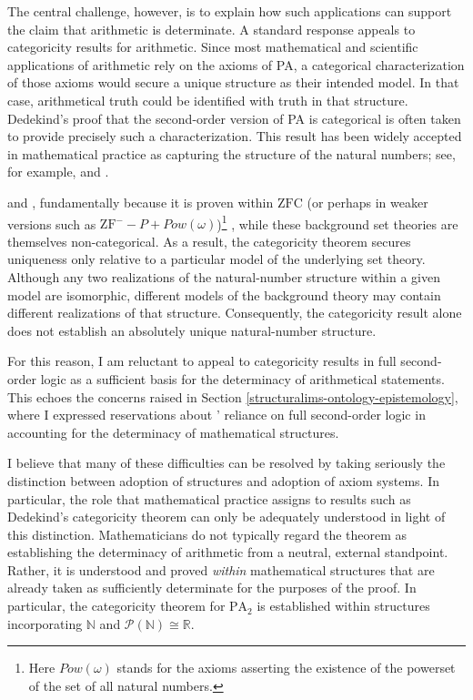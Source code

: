 \documentclass[11pt,a4paper]{book}
\theoremstyle{plain}
\begin{document}
The central challenge, however, is to explain how such applications can support the claim that arithmetic is determinate. A standard response appeals to categoricity results for arithmetic. Since most mathematical and scientific applications of arithmetic rely on the axioms of PA, a categorical characterization of those axioms would secure a unique structure as their intended model. In that case, arithmetical truth could be identified with truth in that structure. Dedekind's proof that the second-order version of PA is categorical \parencite{Dedekind1888} is often taken to provide precisely such a characterization. This result has been widely accepted in mathematical practice as capturing the structure of the natural numbers; see, for example, \textcite[47]{maclane1986mathematics} and \textcite[141]{Ferreiros2023ConStructuralism}.

\textcite[19]{Feferman2011a} and \textcite[511]{Koellner2016}, fundamentally because it is proven within $\mathrm{ZFC}$ (or perhaps in weaker versions such as $\mathrm{ZF}^- -P + Pow(\omega)$)\footnote{Here $Pow(\omega)$ stands for the axioms asserting the existence of the powerset of the set of all natural numbers.} , while these background set theories are themselves non-categorical. As a result, the categoricity theorem secures uniqueness only relative to a particular model of the underlying set theory. Although any two realizations of the natural-number structure within a given model are isomorphic, different models of the background theory may contain different realizations of that structure. Consequently, the categoricity result alone does not establish an absolutely unique natural-number structure. 

For this reason, I am reluctant to appeal to categoricity results in full second-order logic as a sufficient basis for the determinacy of arithmetical statements. This echoes the concerns raised in Section \ref{structuralims-ontology-epistemology}, where I expressed reservations about \textcite{shapiro1991foundations}' reliance on full second-order logic in accounting for the determinacy of mathematical structures.

I believe that many of these difficulties can be resolved by taking seriously the distinction between adoption of structures and adoption of axiom systems. In particular, the role that mathematical practice assigns to results such as Dedekind's categoricity theorem can only be adequately understood in light of this distinction. Mathematicians do not typically regard the theorem as establishing the determinacy of arithmetic from a neutral, external standpoint. Rather, it is understood and proved \textit{within} mathematical structures that are already taken as sufficiently determinate for the purposes of the proof. In particular, the categoricity theorem for $\mathrm{PA}_2$ is established within structures incorporating $\mathbb{N}$ and $\mathcal{P}(\mathbb{N}) \cong \mathbb{R}$.
\end{document}
